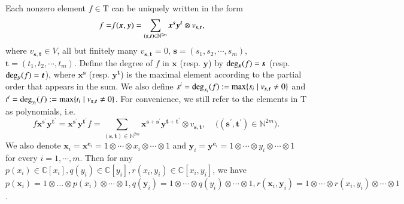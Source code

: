 \documentclass[12pt,reqno]{amsart}
\def\N{\mathbb{N}}
\def\C{\mathbb{C}}
\numberwithin{equation}{section}
\begin{document}
Each nonzero element $f\in\mathrm{T}$ can be uniquely written in the form
\begin{equation}\label{formula 5.17}
\aligned
f=&f(\boldsymbol{x},\boldsymbol{y})=\sum_{(\boldsymbol{s},\boldsymbol{t})\in\N^{2m}}\boldsymbol{x}^{\boldsymbol{s}}\boldsymbol{y}^{\boldsymbol{t}}\otimes v_{\boldsymbol{s},\boldsymbol{t}},
\endaligned 
\end{equation}
where $v_{\boldsymbol{s},\boldsymbol{t}}\in V$, all but finitely many $v_{\boldsymbol{s},\boldsymbol{t}}=0$, $\boldsymbol{s}=(s_1,s_2,\cdots,s_m)$, $\boldsymbol{t}=(t_1,t_2,\cdots,t_m)$. Define the degree of $f$ in $\boldsymbol{x}$ (resp. $\boldsymbol{y}$) by ${\rm deg_{\boldsymbol{x}}}(f)=\boldsymbol{s}$ (resp. ${\rm deg_{\boldsymbol{y}}}(f)=\boldsymbol{t}$), where $\boldsymbol{x}^{\boldsymbol{s}}$ (resp. $\boldsymbol{y}^{\boldsymbol{t}}$) is the maximal element according to the partial order that appears in the sum. We also define 
$s^i={\rm deg}_{x_i}(f):={\rm max}\{s_i\mid v_{\boldsymbol{s},\boldsymbol{t}}\ne 0 \}$ and $t^i={\rm deg}_{y_i}(f):={\rm max}\{t_i\mid v_{\boldsymbol{s},\boldsymbol{t}}\ne 0 \}$. For convenience, we still refer to the elements in $\mathrm{T}$ as polynomials, i.e. \[
    f\boldsymbol{x}^{\boldsymbol{s^\prime}}\boldsymbol{y}^{\boldsymbol{t^\prime}}=\boldsymbol{x}^{\boldsymbol{s^\prime}}\boldsymbol{y}^{\boldsymbol{t^\prime}}f=\sum_{(\boldsymbol{s},\boldsymbol{t})\in\N^{2m}}\boldsymbol{x}^{\boldsymbol{s}+\boldsymbol{s^\prime}}\boldsymbol{y}^{\boldsymbol{t}+\boldsymbol{t^\prime}}\otimes v_{\boldsymbol{s},\boldsymbol{t}},\ \ \ \ \ \Big((\boldsymbol{s^{\prime}},\boldsymbol{t^{\prime}})\in\N^{2m}\Big).
\]
We also denote $\boldsymbol{x}_i=\boldsymbol{x}^{\boldsymbol{e}_i}=1\otimes\cdots \otimes x_i\otimes\cdots\otimes 1$ and $\boldsymbol{y}_i=\boldsymbol{y}^{\boldsymbol{e}_i}=1\otimes\cdots \otimes y_i\otimes\cdots \otimes1$ for every $i=1,\cdots,m$. Then for any $p(x_i)\in\C[x_i],q(y_i)\in\C[y_i],r(x_i,y_i)\in\C[x_i,y_i]$, we have $p(\boldsymbol{x}_i)=1\otimes\dots \otimes p(x_i)\otimes\cdots\otimes 1,q(\boldsymbol{y}_i)=1\otimes\cdots \otimes q(y_i)\otimes\cdots \otimes1,r(\boldsymbol{x}_i,\boldsymbol{y}_i)=1\otimes\cdots \otimes r(x_i,y_i)\otimes\cdots \otimes1$.
\end{document}
